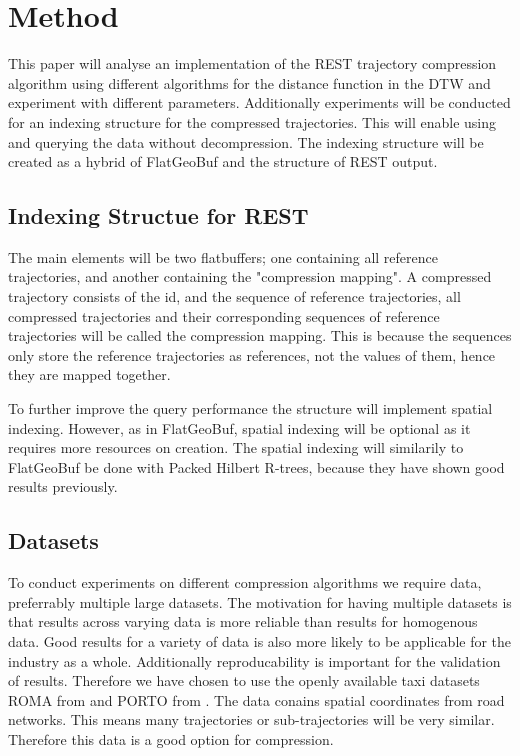 \section{Method}
This paper will analyse an implementation of the REST trajectory compression algorithm using different algorithms for the distance function in the DTW and experiment with different parameters. Additionally experiments will be conducted for an indexing structure for the compressed trajectories. This will enable using and querying the data without decompression. The indexing structure will be created as a hybrid of FlatGeoBuf and the structure of REST output.

\subsection{Indexing Structue for REST}
The main elements will be two flatbuffers; one containing all reference trajectories, and another containing the "compression mapping". A compressed trajectory consists of the id, and the sequence of reference trajectories, all compressed trajectories and their corresponding sequences of reference trajectories will be called the compression mapping. This is because the sequences only store the reference trajectories as references, not the values of them, hence they are mapped together.

To further improve the query performance the structure will implement spatial indexing. However, as in FlatGeoBuf, spatial indexing will be optional as it requires more resources on creation. The spatial indexing will similarily to FlatGeoBuf be done with Packed Hilbert R-trees, because they have shown good results previously.

\subsection{Datasets}
To conduct experiments on different compression algorithms we require data, preferrably multiple large datasets. The motivation for having multiple datasets is that results across varying data is more reliable than results for homogenous data. Good results for a variety of data is also more likely to be applicable for the industry as a whole. Additionally reproducability is important for the validation of results. Therefore we have chosen to use the openly available taxi datasets ROMA from \cite{roma} and PORTO from \cite{porto}. The data conains spatial coordinates from road networks. This means many trajectories or sub-trajectories will be very similar. Therefore this data is a good option for compression.


